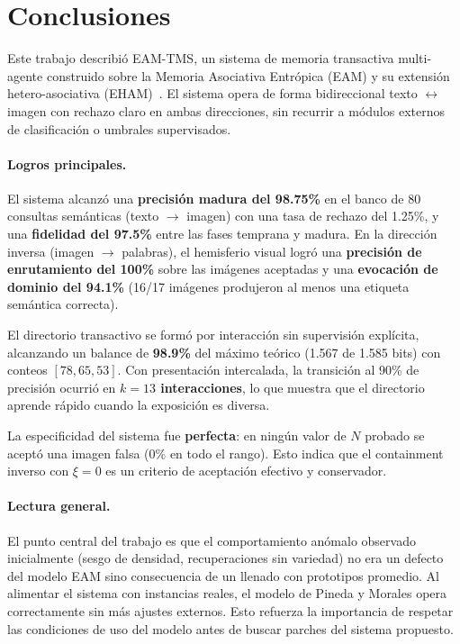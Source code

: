 \section{Conclusiones}
\label{sec:conclusiones}

Este trabajo describió EAM-TMS, un sistema de memoria transactiva multi-agente construido sobre la Memoria Asociativa Entrópica (EAM) y su extensión
hetero-asociativa (EHAM)~\cite{pineda2021entropic,morales2024hetero}.
El sistema opera de forma bidireccional texto $\leftrightarrow$ imagen con rechazo claro en ambas direcciones, sin recurrir a módulos externos de clasificación o umbrales supervisados.

\paragraph{Logros principales.}
El sistema alcanzó una \textbf{precisión madura del 98.75\%} en el banco de 80 consultas semánticas (texto $\to$ imagen) con una tasa de rechazo del 1.25\%, y una \textbf{fidelidad del 97.5\%} entre las fases temprana y madura.
En la dirección inversa (imagen $\to$ palabras), el hemisferio visual logró una \textbf{precisión de enrutamiento del 100\%} sobre las imágenes aceptadas y una \textbf{evocación de dominio del 94.1\%} (16/17 imágenes produjeron al menos una etiqueta semántica correcta).

El directorio transactivo se formó por interacción sin supervisión explícita, alcanzando un balance de \textbf{98.9\%} del máximo teórico (1.567 de 1.585 bits) con conteos $[78, 65, 53]$.
Con presentación intercalada, la transición al 90\% de precisión ocurrió en \textbf{$k = 13$ interacciones}, lo que muestra que el directorio aprende rápido cuando la exposición es diversa.

La especificidad del sistema fue \textbf{perfecta}: en ningún valor de $N$ probado se aceptó una imagen falsa (0\% en todo el rango). Esto indica que el containment inverso con $\xi = 0$ es un criterio de aceptación efectivo y conservador.

\paragraph{Lectura general.}
El punto central del trabajo es que el comportamiento anómalo observado inicialmente (sesgo de densidad, recuperaciones sin variedad) no era un defecto del modelo EAM sino consecuencia de un llenado con prototipos promedio.
Al alimentar el sistema con instancias reales, el modelo de Pineda y Morales opera correctamente sin más ajustes externos.
Esto refuerza la importancia de respetar las condiciones de uso del modelo antes de buscar parches del sistema propuesto.

